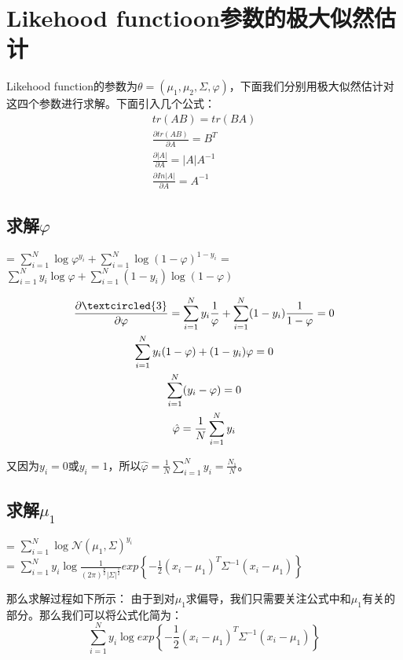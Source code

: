 \documentclass[a4paper]{article}
\begin{document}
\section{Likehood functioon参数的极大似然估计}
Likehood function的参数为$\theta = (\mu_1,\mu_2,\Sigma,\varphi)$，下面我们分别用极大似然估计对这四个参数进行求解。下面引入几个公式：
\begin{gather}
    tr(AB) = tr(BA) \\
    \frac{\partial tr(AB)}{\partial A} = B^T \\
    \frac{\partial|A|}{\partial A} = |A|A^{-1} \\
    \frac{\partial In|A|}{\partial A} = A^{-1}
\end{gather}

\subsection{求解$\varphi$}
\begin{center}
     = $\sum_{i=1}^N \log \varphi^{y_i} + \sum_{i=1}^N \log (1-\varphi)^{1-y_i}$ = $\sum_{i=1}^N y_i\log \varphi + \sum_{i=1}^N (1-y_i) \log (1-\varphi)$ 
\end{center}
\begin{gather}
    \frac{\partial   \textcircled{3}}{\partial \varphi} = \sum_{i=1}^Ny_i\frac{1}{\varphi} + \sum_{i=1}^N (1-y_i)\frac{1}{1-\varphi} = 0 \\
    \sum_{i=1}^N y_i(1-\varphi) + (1-y_i)\varphi = 0 \\
    \sum_{i=1}^N (y_i-\varphi) = 0\\
    \hat{\varphi} = \frac{1}{N} \sum_{i=1}^N y_i
\end{gather}

又因为$y_i=0$或$y_i=1$，所以$\hat{\varphi} = \frac{1}{N} \sum_{i=1}^N y_i = \frac{N_1}{N}$。

\subsection{求解$\mu_1$}
\begin{center}
     = $\sum_{i=1}^N\log \mathcal{N}(\mu_1,\Sigma)^{y_i}$ \\
    = $\sum_{i=1}^Ny_i\log \frac{1}{(2\pi)^{\frac{p}{2}}|\Sigma|^{\frac{1}{2}}}exp\left\{ -\frac{1}{2}(x_i-\mu_1)^T\Sigma^{-1}(x_i-\mu_1) \right\}$ \\
\end{center}

那么求解过程如下所示：
由于到对$\mu_1$求偏导，我们只需要关注公式中和$\mu_1$有关的部分。那么我们可以将公式化简为：
\begin{equation}
    \sum_{i=1}^Ny_i\log exp\left\{ -\frac{1}{2}(x_i-\mu_1)^T\Sigma^{-1}(x_i-\mu_1) \right\}
\end{equation}
\end{document}
